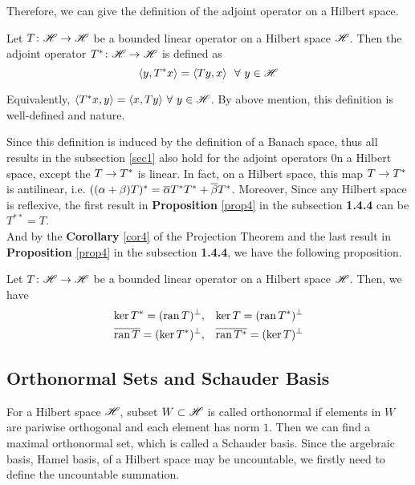 \documentclass[a4paper,11pt]{report}
\begin{document}
Therefore, we can give the definition of the adjoint operator on a Hilbert space.
\begin{defn}
	Let $T \colon \mathscr{H} \rightarrow \mathscr{H}$ be a bounded linear operator on a Hilbert space $\mathscr{H}$. Then the adjoint operator $T^{*} \colon \mathscr{H} \rightarrow \mathscr{H}$ is defined as
	\begin{equation*}
		\langle y, T^{*}x \rangle = \langle Ty, x \rangle ~~ \forall~ y \in \mathscr{H}
	\end{equation*}
\end{defn}
\begin{rem}
	Equivalently, $\langle T^{*}x, y \rangle = \langle x, Ty \rangle ~ \forall~ y \in \mathscr{H}$. By above mention, this definition is well-defined and nature.
\end{rem}

Since this definition is induced by the definition of a Banach space, thus all results in the subsection \ref{sec1} also hold for the adjoint operators 0n a Hilbert space, except the $T \rightarrow T^{*}$ is linear. In fact, on a Hilbert space, this map $T \rightarrow T^{*}$ is antilinear, i.e. $((\alpha + \beta)T)^{*} = \overline{\alpha}T^{*}T^{*} + \overline{\beta}T^{*}$. Moreover, Since any Hilbert space is reflexive, the first result in \textbf{Proposition} \ref{prop4} in the subsection \textbf{1.4.4} can be $T^{**} = T$.\\
And by the \textbf{Corollary} \ref{cor4} of the Projection Theorem and the last result in \textbf{Proposition} \ref{prop4} in the subsection \textbf{1.4.4}, we have the following proposition.
\begin{prop}
	Let $T \colon \mathscr{H} \rightarrow \mathscr{H}$ be a bounded linear operator on a Hilbert space $\mathscr{H}$. Then, we have
	\begin{eqnarray*}
		\ker{T^{*}} = (\operatorname{ran}{T})^{\bot} &,& \ker{T}=(\operatorname{ran}{T^{*}})^{\bot} \\
		\overline{\operatorname{ran}{T}} = (\ker{T^{*}})^{\bot} &,& \overline{\operatorname{ran}{T^{*}}} = (\ker{T})^{\bot}
	\end{eqnarray*}
\end{prop}

\subsection{Orthonormal Sets and Schauder Basis}

For a Hilbert space $\mathscr{H}$, subset $W \subset \mathscr{H}$ is called orthonormal if  elements in $W$ are pariwise orthogonal and each element has norm $1$. Then we can find a maximal orthonormal set, which is called a Schauder basis. Since the argebraic basis, Hamel basis, of a Hilbert space may be uncountable, we firstly need to define the uncountable summation.
\end{document}
